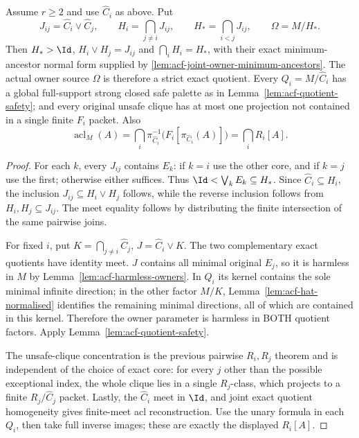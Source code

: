 \begin{corollary}
\label{cor:acf-hat-factors}
Assume $r\ge2$ and use $\widehat C_i$ as above.  Put
\[
 J_{ij}=\widehat C_i\vee\widehat C_j,\qquad
 H_i=\bigcap_{j\ne i}J_{ij},\qquad
 H_*=\bigcap_{i<j}J_{ij},\qquad
 \Omega=M/H_*.
\]
Then $H_*>\Id$, $H_i\vee H_j=J_{ij}$ and
$\bigcap_iH_i=H_*$, with their exact
minimum-ancestor normal form supplied
by \cref{lem:acf-joint-owner-minimum-ancestors}.
The actual owner source $\Omega$
is therefore a strict exact quotient.
Every $Q_i=M/\widehat C_i$ has a global full-support
strong closed safe palette as in
Lemma~\ref{lem:acf-quotient-safety}; and every original
unsafe clique has at most one projection not contained
in a single finite $F_i$ packet.  Also
\[
 \operatorname{acl}_M(A)=
 \bigcap_i\pi_{\widehat C_i}^{-1}
          \bigl(F_i[\pi_{\widehat C_i}(A)]\bigr)
 =\bigcap_iR_i[A].
\]
\end{corollary}
\begin{proof}
For each $k$, every $J_{ij}$ contains $E_k$:
if $k=i$ use the other core, and if $k=j$ use the first;
otherwise either suffices.  Thus
$\Id<\bigvee_kE_k\subseteq H_*$.  Since
$\widehat C_i\subseteq H_i$, the inclusion
$J_{ij}\subseteq H_i\vee H_j$ follows, while the
reverse inclusion follows from $H_i,H_j\subseteq J_{ij}$.
The meet equality follows by distributing the finite
intersection of the same pairwise joins.

For fixed $i$, put $K=\bigcap_{j\ne i}\widehat C_j$,
$J=\widehat C_i\vee K$.  The two complementary
exact quotients have identity meet.  $J$ contains all
minimal original $E_j$, so it is harmless in $M$ by
Lemma~\ref{lem:acf-harmless-owners}.  In $Q_i$
its kernel contains the sole minimal infinite direction;
in the other factor $M/K$, Lemma~\ref{lem:acf-hat-normalised}
identifies the remaining minimal directions, all of
which are contained in this kernel.  Therefore the
owner parameter is harmless in BOTH quotient factors.
Apply Lemma~\ref{lem:acf-quotient-safety}.

The unsafe-clique concentration is the previous
pairwise $R_i,R_j$ theorem and is independent of the
choice of exact core: for every $j$ other than the
possible exceptional index, the whole clique lies
in a single $R_j$-class, which projects to a finite
$R_j/\widehat C_j$ packet.  Lastly, the $\widehat C_i$
meet in $\Id$, and joint exact quotient homogeneity
gives finite-meet acl reconstruction.  Use the unary
formula in each $Q_i$, then take full inverse images;
these are exactly the displayed $R_i[A]$.
\end{proof}
